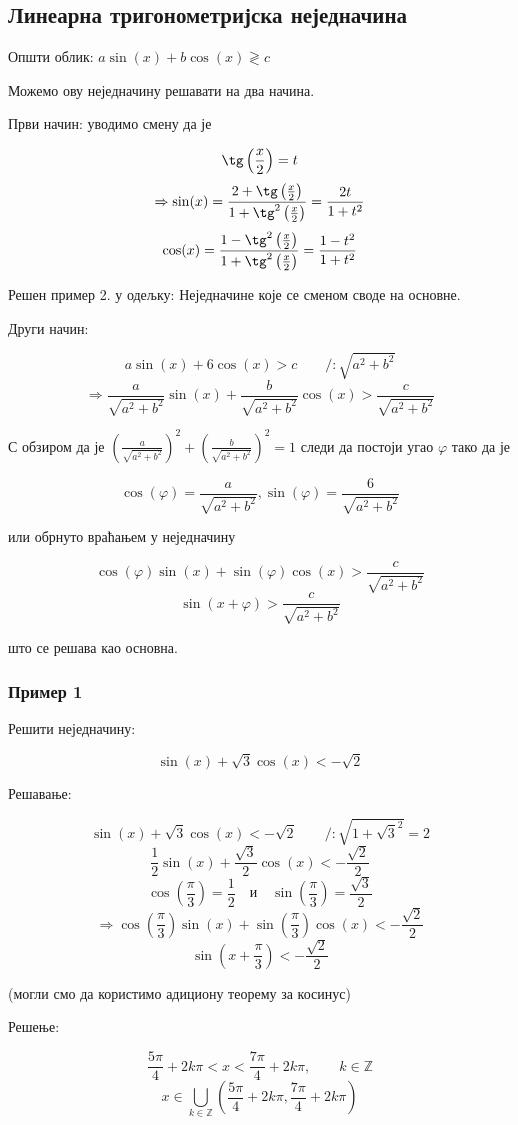 \documentclass[../diplomski.tex]{subfiles}
\begin{document}
\subsection{Линеарна тригонометријска неједначина}

Општи облик: $a\sin(x)+b\cos(x)\gtrless c$

Можемо ову неједначину решавати на два начина.

Први начин: уводимо смену да је

\[\tg\left(\frac{x}{2}\right)=t\]
\[\Rightarrow\sin(x)=\frac{2+\tg\left(\frac{x}{2}\right)}{1+\tg^{2}\left(\frac{x}{2}\right)}=\frac{2t}{1+t^{2}}\]
\[\cos(x)=\frac{1-\tg^{2}\left(\frac{x}{2}\right)}{1+\tg^{2}\left(\frac{x}{2}\right)}=\frac{1-t^{2}}{1+t^{2}}\]

Решен пример 2. у одељку: Неједначине које се сменом своде на основне.

Други начин:

\[a\sin(x)+6\cos(x)>c\qquad/:\sqrt{a^{2}+b^{2}}\]
\[\Rightarrow\frac{a}{\sqrt{a^{2}+b^{2}}}\sin(x)+\frac{b}{\sqrt{a^{2}+b^{2}}}\cos(x)>\frac{c}{\sqrt{a^{2}+b^{2}}}\]

С обзиром да је $\left(\frac{a}{\sqrt{a^{2}+b^{2}}}\right)^{2}+\left(\frac{b}{\sqrt{a^{2}+b^{2}}}\right)^{2}=1$
следи да постоји угао $\varphi$ тако да је

\[\cos(\varphi)=\frac{a}{\sqrt{a^{2}+b^{2}}},\sin(\varphi)=\frac{6}{\sqrt{a^{2}+b^{2}}}\]

или обрнуто враћањем у неједначину

\[\cos(\varphi)\sin(x)+\sin(\varphi)\cos(x)>\frac{c}{\sqrt{a^{2}+b^{2}}}\]
\[\sin(x+\varphi)>\frac{c}{\sqrt{a^{2}+b^{2}}}\]

што се решава као основна.

\subsubsection{Пример 1}

Решити неједначину:

\[\sin(x)+\sqrt{3}\cos(x)<-\sqrt{2}\]

Решавање:

\[\sin(x)+\sqrt{3}\cos(x)<-\sqrt{2}\qquad/:\sqrt{1+\sqrt{3}^{2}}=2\]
\[\frac{1}{2}\sin(x)+\frac{\sqrt{3}}{2}\cos(x)<-\frac{\sqrt{2}}{2}\]
\[\cos\left(\frac{\pi}{3}\right)=\frac{1}{2}\quad\text{и}\quad\sin\left(\frac{\pi}{3}\right)=\frac{\sqrt{3}}{2}\]
\[\Rightarrow\cos\left(\frac{\pi}{3}\right)\sin(x)+\sin\left(\frac{\pi}{3}\right)\cos(x)<-\frac{\sqrt{2}}{2}\]
\[\sin\left(x+\frac{\pi}{3}\right)<-\frac{\sqrt{2}}{2}\]

(могли смо да користимо адициону теорему за косинус)

Решење:



\[\frac{5\pi}{4}+2k\pi<x<\frac{7\pi}{4}+2k\pi,\qquad k\in\mathbb{Z}\]
\[x\in\bigcup_{k\in\mathbb{Z}}\left(\frac{5\pi}{4}+2k\pi,\frac{7\pi}{4}+2k\pi\right)\]
\end{document}
